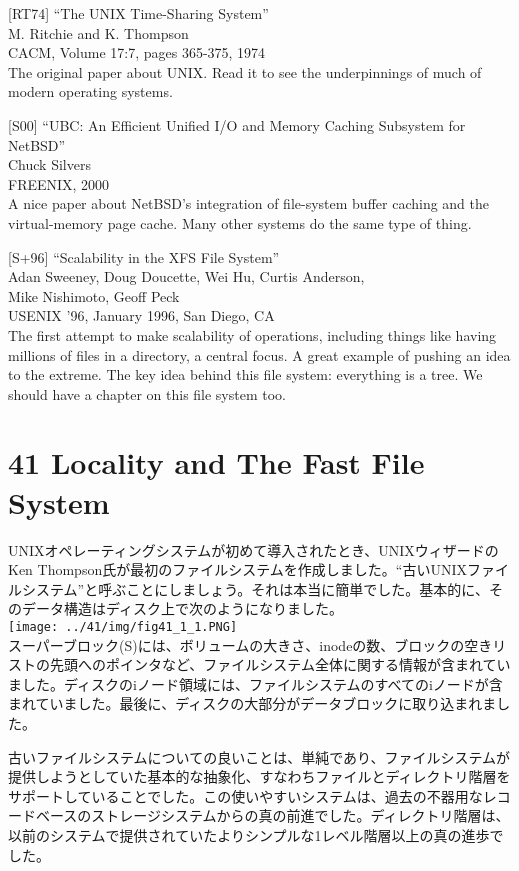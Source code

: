 {[}RT74{]} ``The UNIX Time-Sharing System''\\
M. Ritchie and K. Thompson\\
CACM, Volume 17:7, pages 365-375, 1974\\
The original paper about UNIX. Read it to see the underpinnings of much
of modern operating systems.

{[}S00{]} ``UBC: An Efficient Unified I/O and Memory Caching Subsystem
for NetBSD''\\
Chuck Silvers\\
FREENIX, 2000\\
A nice paper about NetBSD's integration of file-system buffer caching
and the virtual-memory page cache. Many other systems do the same type
of thing.

{[}S+96{]} ``Scalability in the XFS File System''\\
Adan Sweeney, Doug Doucette, Wei Hu, Curtis Anderson,\\
Mike Nishimoto, Geoff Peck\\
USENIX '96, January 1996, San Diego, CA\\
The first attempt to make scalability of operations, including things
like having millions of files in a directory, a central focus. A great
example of pushing an idea to the extreme. The key idea behind this file
system: everything is a tree. We should have a chapter on this file
system too.

\hypertarget{locality-and-the-fast-file-system}{%
\section*{41 Locality and The Fast File
System}\label{locality-and-the-fast-file-system}}

UNIXオペレーティングシステムが初めて導入されたとき、UNIXウィザードのKen
Thompson氏が最初のファイルシステムを作成しました。``古いUNIXファイルシステム''と呼ぶことにしましょう。それは本当に簡単でした。基本的に、そのデータ構造はディスク上で次のようになりました。\\
\texttt{[image: ../41/img/fig41\_1\_1.PNG]}\\
スーパーブロック(S)には、ボリュームの大きさ、inodeの数、ブロックの空きリストの先頭へのポインタなど、ファイルシステム全体に関する情報が含まれていました。ディスクのiノード領域には、ファイルシステムのすべてのiノードが含まれていました。最後に、ディスクの大部分がデータブロックに取り込まれました。

古いファイルシステムについての良いことは、単純であり、ファイルシステムが提供しようとしていた基本的な抽象化、すなわちファイルとディレクトリ階層をサポートしていることでした。この使いやすいシステムは、過去の不器用なレコードベースのストレージシステムからの真の前進でした。ディレクトリ階層は、以前のシステムで提供されていたよりシンプルな1レベル階層以上の真の進歩でした。

